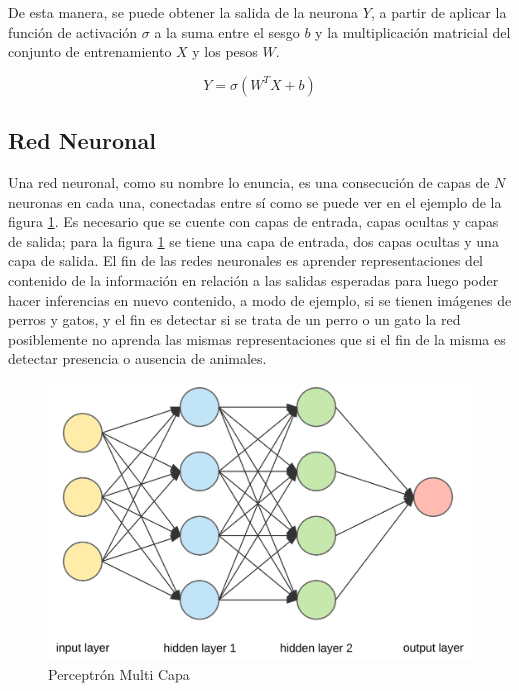 De esta manera, se puede obtener la salida de la neurona \(Y\), a partir de aplicar la función de activación \(\sigma\) a la suma entre el sesgo \(b\) y la multiplicación matricial del conjunto de entrenamiento \(X\) y los pesos \(W\).

\begin{equation}
Y=\sigma\left(W^{T} X+b\right)
\end{equation}


\subsection{Red Neuronal}\label{red_neuronal}

 Una red neuronal, como su nombre lo enuncia, es una consecución de capas de \(N\) neuronas en cada una, conectadas entre sí como se puede ver en el ejemplo de la figura \ref{fig:redneuronal}. Es necesario que se cuente con capas de entrada, capas ocultas y capas de salida; para la figura \ref{fig:redneuronal} se tiene una capa de entrada, dos capas ocultas y una capa de salida. 
 El fin de las redes neuronales es aprender representaciones del contenido de la información en relación a las salidas esperadas para luego poder hacer inferencias en nuevo contenido, a modo de ejemplo, si se tienen imágenes de perros y gatos, y el fin es detectar si se trata de un perro o un gato la red posiblemente no aprenda las mismas representaciones que si el fin de la misma es detectar presencia o ausencia de animales.
 
 
 \begin{figure}
 	\centering
 	\includegraphics[width=0.7\linewidth]{images/red_neuronal}
 	\caption[Ejemplo red neuronal]{Perceptrón Multi Capa}
 	\label{fig:redneuronal}
 \end{figure}

